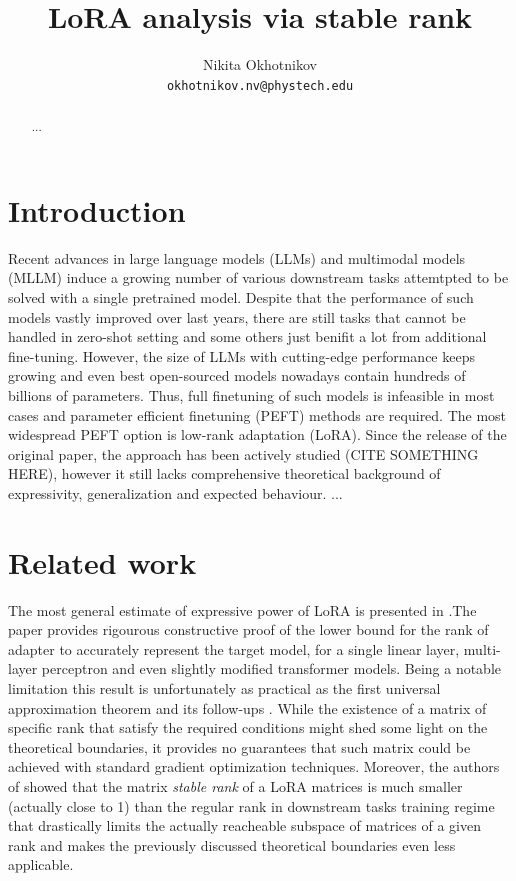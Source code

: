 \documentclass{article}
\title{LoRA analysis via stable rank}
\author{Nikita Okhotnikov\\
	\texttt{okhotnikov.nv@phystech.edu} \\
}
\date{}
\begin{document}
    \maketitle
    \begin{abstract}
        ...

    \end{abstract}



    \section{Introduction}
        Recent advances in large language models (LLMs) and multimodal models (MLLM) induce a growing number of various downstream tasks attemtpted to be solved with a single pretrained model. Despite that the performance of such models vastly improved over last years, there are still tasks that cannot be handled in zero-shot setting and some others just benifit a lot from additional fine-tuning. However, the size of LLMs with cutting-edge performance keeps growing and even best open-sourced models nowadays contain hundreds of billions of parameters\cite{deepseekai2025deepseekr1incentivizingreasoningcapability}\cite{kimiteam2025kimik2openagentic}\cite{yang2025qwen3technicalreport}\cite{grattafiori2024llama3herdmodels}. Thus, full finetuning of such models is infeasible in most cases and parameter efficient finetuning (PEFT) methods are required. The most widespread PEFT option is low-rank adaptation (LoRA)\cite{hu2021loralowrankadaptationlarge}. Since the release of the original paper, the approach has been actively studied (CITE SOMETHING HERE), however it still lacks comprehensive theoretical background of expressivity, generalization and expected behaviour. 
        ...

    \section{Related work}
        The most general estimate of expressive power of LoRA is presented in \cite{zeng2024expressivepowerlowrankadaptation}.The paper provides rigourous constructive proof of the lower bound for the rank of adapter to accurately represent the target model, for a single linear layer, multi-layer perceptron and even slightly modified transformer models. Being a notable limitation this result is unfortunately as practical as the first universal approximation theorem \cite{hornik1989multilayer} and its follow-ups \cite{bengio2011expressive}\cite{eldan2016power}\cite{liang2016deep}. While the existence of a matrix of specific rank that satisfy the required conditions might shed some light on the theoretical boundaries, it provides no guarantees that such matrix could be achieved with standard gradient optimization techniques. Moreover, the authors of \cite{lion2025polar} showed that the matrix \textit{stable rank} \cite{rudelson2007sampling} of a LoRA matrices is much smaller (actually close to 1) than the regular rank in downstream tasks training regime that drastically limits the actually reacheable subspace of matrices of a given rank and makes the previously discussed theoretical boundaries even less applicable.
        
\end{document}
